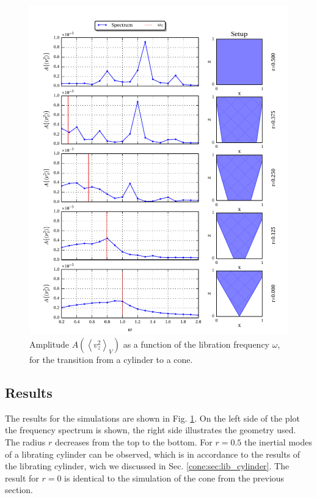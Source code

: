 \begin{figure}[!pt]
  \centering
  \includegraphics{gfx/cone/transition/transition.pdf}
  \caption{\label{fig:cone:transition}
      Amplitude $A\left(\left<v^2_z\right>_V\right)$ as a function of the libration frequency $\omega$,
      for the transition from a cylinder to a cone.
  }
\end{figure}

\subsection{Results}%

The results for the simulations are shown in Fig. \ref{fig:cone:transition}.
On the left side of the plot  the frequency spectrum is shown, the right side illustrates the geometry used.
The radius $r$ decreases from the top to the bottom.
For $r=0.5$  the inertial modes of a librating cylinder can be observed, which is in accordance
to the results of the librating  cylinder, wich we discussed in Sec. \ref{cone:sec:lib_cylinder}.
The result for $r=0$ is identical to the simulation of the cone from the previous section.

